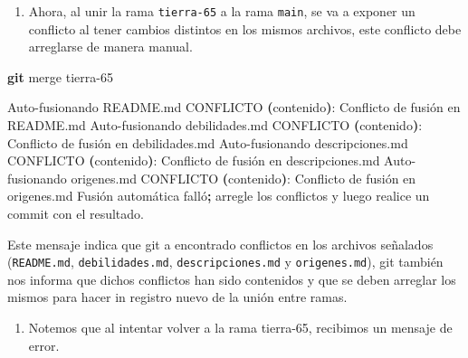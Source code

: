 \documentclass[
]{book}
\newenvironment{Shaded}{\begin{snugshade}}{\end{snugshade}}
\newcommand{\BuiltInTok}[1]{#1}
\newcommand{\ErrorTok}[1]{\textcolor[rgb]{0.64,0.00,0.00}{\textbf{#1}}}
\newcommand{\ExtensionTok}[1]{#1}
\newcommand{\FunctionTok}[1]{\textcolor[rgb]{0.13,0.29,0.53}{\textbf{#1}}}
\newcommand{\KeywordTok}[1]{\textcolor[rgb]{0.13,0.29,0.53}{\textbf{#1}}}
\newcommand{\NormalTok}[1]{#1}
\providecommand{\tightlist}{%
  \setlength{\itemsep}{0pt}\setlength{\parskip}{0pt}}
\begin{document}
\begin{enumerate}
\def\labelenumi{\arabic{enumi}.}
\setcounter{enumi}{5}
\tightlist
\item
  Ahora, al unir la rama \texttt{tierra-65} a la rama \texttt{main}, se va a exponer un conflicto al tener cambios distintos en los mismos archivos, este conflicto debe arreglarse de manera manual.
\end{enumerate}

\begin{Shaded}
\begin{Highlighting}[]
\FunctionTok{git}\NormalTok{ merge tierra{-}65}
\end{Highlighting}
\end{Shaded}

\begin{Shaded}
\begin{Highlighting}[]
\ExtensionTok{Auto{-}fusionando}\NormalTok{ README.md}
\ExtensionTok{CONFLICTO} \ErrorTok{(}\ExtensionTok{contenido}\KeywordTok{)}\BuiltInTok{:}\NormalTok{ Conflicto de fusión en README.md}
\ExtensionTok{Auto{-}fusionando}\NormalTok{ debilidades.md}
\ExtensionTok{CONFLICTO} \ErrorTok{(}\ExtensionTok{contenido}\KeywordTok{)}\BuiltInTok{:}\NormalTok{ Conflicto de fusión en debilidades.md}
\ExtensionTok{Auto{-}fusionando}\NormalTok{ descripciones.md}
\ExtensionTok{CONFLICTO} \ErrorTok{(}\ExtensionTok{contenido}\KeywordTok{)}\BuiltInTok{:}\NormalTok{ Conflicto de fusión en descripciones.md}
\ExtensionTok{Auto{-}fusionando}\NormalTok{ origenes.md}
\ExtensionTok{CONFLICTO} \ErrorTok{(}\ExtensionTok{contenido}\KeywordTok{)}\BuiltInTok{:}\NormalTok{ Conflicto de fusión en origenes.md}
\ExtensionTok{Fusión}\NormalTok{ automática falló}\KeywordTok{;} \ExtensionTok{arregle}\NormalTok{ los conflictos y luego realice un commit con el resultado.}
\end{Highlighting}
\end{Shaded}

Este mensaje indica que git a encontrado conflictos en los archivos señalados (\texttt{README.md}, \texttt{debilidades.md}, \texttt{descripciones.md} y \texttt{origenes.md}), git también nos informa que dichos conflictos han sido contenidos y que se deben arreglar los mismos para hacer in registro nuevo de la unión entre ramas.

\begin{enumerate}
\def\labelenumi{\arabic{enumi}.}
\setcounter{enumi}{5}
\tightlist
\item
  Notemos que al intentar volver a la rama tierra-65, recibimos un mensaje de error.
\end{enumerate}
\end{document}
